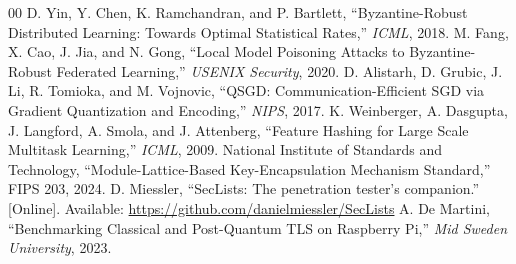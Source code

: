 \documentclass[conference]{IEEEtran}
\begin{document}
\begin{thebibliography}{00}
 D. Yin, Y. Chen, K. Ramchandran, and P. Bartlett, ``Byzantine-Robust Distributed Learning: Towards Optimal Statistical Rates,'' \textit{ICML}, 2018.
 M. Fang, X. Cao, J. Jia, and N. Gong, ``Local Model Poisoning Attacks to Byzantine-Robust Federated Learning,'' \textit{USENIX Security}, 2020.
 D. Alistarh, D. Grubic, J. Li, R. Tomioka, and M. Vojnovic, ``QSGD: Communication-Efficient SGD via Gradient Quantization and Encoding,'' \textit{NIPS}, 2017.
 K. Weinberger, A. Dasgupta, J. Langford, A. Smola, and J. Attenberg, ``Feature Hashing for Large Scale Multitask Learning,'' \textit{ICML}, 2009.
 National Institute of Standards and Technology, ``Module-Lattice-Based Key-Encapsulation Mechanism Standard,'' FIPS 203, 2024.
 D. Miessler, ``SecLists: The penetration tester's companion.'' [Online]. Available: \url{https://github.com/danielmiessler/SecLists}
 A. De Martini, ``Benchmarking Classical and Post-Quantum TLS on Raspberry Pi,'' \textit{Mid Sweden University}, 2023.
\end{thebibliography}
\end{document}
